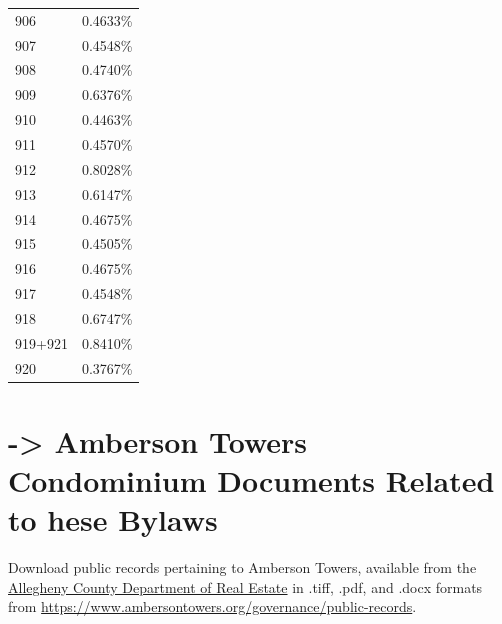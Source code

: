 \documentclass[
  14pt,
]{book}
\begin{document}
\begin{longtable}[]{@{}ll@{}}
906 & 0.4633\% \\
907 & 0.4548\% \\
908 & 0.4740\% \\
909 & 0.6376\% \\
910 & 0.4463\% \\
911 & 0.4570\% \\
912 & 0.8028\% \\
913 & 0.6147\% \\
914 & 0.4675\% \\
915 & 0.4505\% \\
916 & 0.4675\% \\
917 & 0.4548\% \\
918 & 0.6747\% \\
919+921 & 0.8410\% \\
920 & 0.3767\% \\
\bottomrule
\end{longtable}

\hypertarget{appendix-appendix}{%
\appendix}


\hypertarget{ashell}{%
\chapter{\texorpdfstring{-\textgreater{} Amberson Towers Condominium Documents Related to hese Bylaws}{-\textgreater{} Amberson Towers Condominium  Documents Related to hese Bylaws}}\label{ashell}}

Download public records pertaining to Amberson Towers, available from the \href{https://www.google.com/url?q=https\%3A\%2F\%2Fpa_allegheny.uslandrecords.com\%2F\&sa=D\&sntz=1\&usg=AFQjCNF6RMGma-NE-RbwoOWu70CygwFIhw}{Allegheny County Department of Real Estate} in .tiff, .pdf, and .docx formats from \url{https://www.ambersontowers.org/governance/public-records}.

  
\end{document}
